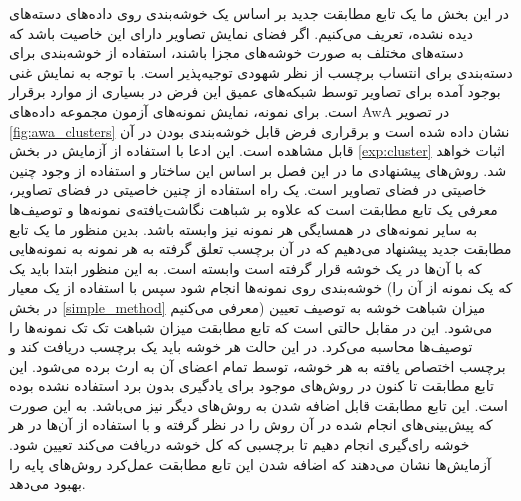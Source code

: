 در این بخش ما یک تابع مطابقت جدید بر اساس یک خوشه‌بندی روی داده‌های دسته‌های دیده نشده، تعریف می‌کنیم. اگر فضای نمایش تصاویر دارای این خاصیت باشد که دسته‌های مختلف به صورت خوشه‌های مجزا باشند، استفاده از خوشه‌بندی برای دسته‌بندی برای انتساب برچسب از نظر شهودی توجیه‌پذیر است.
با توجه به نمایش غنی بوجود آمده برای تصاویر توسط شبکه‌های عمیق این فرض در بسیاری از موارد برقرار است. برای نمونه، نمایش  نمونه‌های آزمون مجموعه داده‌های AwA در تصویر
\ref{fig:awa_clusters}
نشان داده شده است و برقراری فرض قابل خوشه‌بندی بودن در آن قابل مشاهده است. این ادعا با استفاده از آزمایش در بخش
\ref{exp:cluster}
اثبات خواهد شد. روش‌های پیشنهادی ما در این فصل بر اساس این ساختار و استفاده از وجود چنین خاصیتی در فضای تصاویر است.
یک راه استفاده از چنین خاصیتی در فضای تصاویر، معرفی یک تابع مطابقت است که علاوه بر شباهت نگاشت‌یافته‌ی نمونه‌ها و توصیف‌ها به سایر نمونه‌های در همسایگی هر نمونه نیز وابسته باشد. بدین منظور ما یک تابع مطابقت جدید پیشنهاد می‌دهیم که در آن برچسب تعلق گرفته به هر نمونه به نمونه‌هایی که با آن‌ها در یک خوشه قرار گرفته است وابسته است. به این منظور ابتدا باید یک خوشه‌بندی روی نمونه‌ها انجام شود سپس با استفاده از یک معیار (که یک نمونه از آن را در بخش \ref{simple_method} معرفی می‌کنیم) میزان شباهت خوشه به توصیف تعیین می‌شود. این در مقابل حالتی است که تابع مطابقت میزان شباهت تک تک نمونه‌ها را توصیف‌ها محاسبه می‌کرد.
 در این حالت هر خوشه باید یک برچسب دریافت کند و برچسب اختصاص یافته به هر خوشه، توسط تمام اعضای آن به ارث برده می‌شود. این تابع مطابقت تا کنون در روش‌های موجود برای یادگیری بدون برد استفاده نشده بوده است. این تابع مطابقت قابل اضافه شدن به روش‌های دیگر نیز می‌باشد. به این صورت که پیش‌بینی‌های انجام شده در آن روش را در نظر گرفته و با استفاده از آن‌ها در هر خوشه رای‌گیری انجام دهیم تا برچسبی که کل خوشه دریافت می‌کند تعیین شود. آزمایش‌ها نشان می‌دهند که  اضافه شدن این تابع مطابقت عمل‌کرد روش‌های پایه را بهبود می‌دهد.

